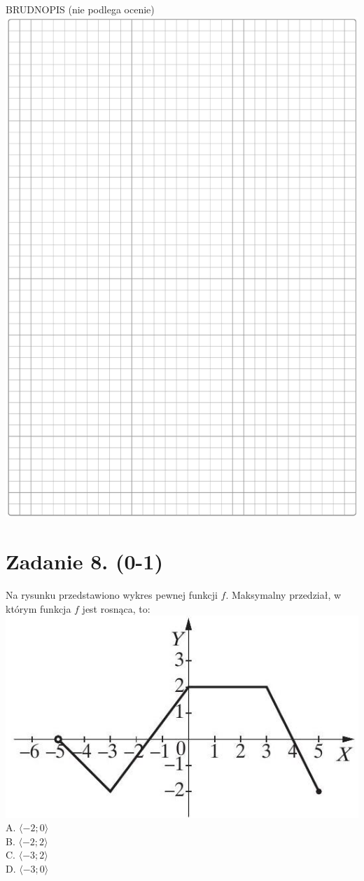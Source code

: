 \documentclass[10pt]{article}
\begin{document}
BRUDNOPIS (nie podlega ocenie)\\
\includegraphics[max width=\textwidth, center]{2024_11_21_724abc2cf5a71562f5b2g-03}

\section*{Zadanie 8. (0-1)}
Na rysunku przedstawiono wykres pewnej funkcji \(f\). Maksymalny przedział, w którym funkcja \(f\) jest rosnąca, to:\\
\includegraphics[max width=\textwidth, center]{2024_11_21_724abc2cf5a71562f5b2g-04}\\
A. \(\langle-2 ; 0\rangle\)\\
B. \(\langle-2 ; 2\rangle\)\\
C. \(\langle-3 ; 2\rangle\)\\
D. \(\langle-3 ; 0\rangle\)
\end{document}
